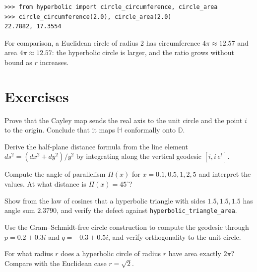 \begin{example}
\begin{lstlisting}[style=python]
>>> from hyperbolic import circle_circumference, circle_area
>>> circle_circumference(2.0), circle_area(2.0)
22.7882, 17.3554
\end{lstlisting}
For comparison, a Euclidean circle of radius 2 has circumference $4\pi \approx 12.57$ and area $4\pi \approx 12.57$: the hyperbolic circle is larger, and the ratio grows without bound as $r$ increases.
\end{example}

\section{Exercises}

\begin{exercise}
Prove that the Cayley map sends the real axis to the unit circle and the point $i$ to the origin. Conclude that it maps $\mathbb{H}$ conformally onto $\mathbb{D}$.
\end{exercise}

\begin{exercise}
Derive the half-plane distance formula from the line element $ds^2 = (dx^2 + dy^2)/y^2$ by integrating along the vertical geodesic $[i, i\,e^t]$.
\end{exercise}

\begin{exercise}
Compute the angle of parallelism $\Pi(x)$ for $x = 0.1, 0.5, 1, 2, 5$ and interpret the values. At what distance is $\Pi(x) = 45^\circ$?
\end{exercise}

\begin{exercise}
Show from the law of cosines that a hyperbolic triangle with sides $1.5, 1.5, 1.5$ has angle sum $2.3790$, and verify the defect against \texttt{hyperbolic\_triangle\_area}.
\end{exercise}

\begin{exercise}
Use the Gram--Schmidt-free circle construction to compute the geodesic through $p = 0.2 + 0.3i$ and $q = -0.3 + 0.5i$, and verify orthogonality to the unit circle.
\end{exercise}

\begin{exercise}
For what radius $r$ does a hyperbolic circle of radius $r$ have area exactly $2\pi$? Compare with the Euclidean case $r = \sqrt{2}$.
\end{exercise}

